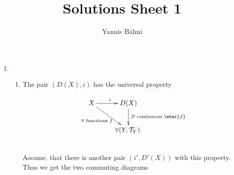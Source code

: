 

\title{Solutions Sheet 1}
\author{Yannis B\"{a}hni}
\address[Yannis B\"{a}hni]{University of Zurich, R\"{a}mistrasse 71, 8006 Zurich}


\maketitle
\thispagestyle{fancy}

\begin{enumerate}[label = \textbf{Exercise \arabic*.},wide = 0pt, itemsep=1.5ex]
	\item ~
		\begin{enumerate}[label = \textup{(}\alph*\textup{)}]
			\item The pair $(D(X),i)$ has the universal property
				\begin{figure}[h!tb]
					\begin{displaymath}
    					\xymatrix{X \ar[r]^i\ar[dr]_{\forall \text{ functions } f} & D(X) \ar[d]^{\exists ! \text{ continuous } \wbar{f}}\\
						 & \forall (Y,\Tcal_Y).}
					\end{displaymath}
				\end{figure}\\
				Assume, that there is another pair $(i',D'(X))$ with this property. Thus we get the two commuting diagrams


\end{enumerate}
\end{enumerate}
